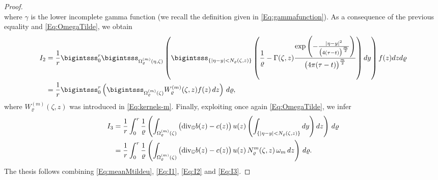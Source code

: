 \documentclass[11pt,a4paper]{article}
\numberwithin{equation}{section}
\def \r {\varrho}
\def \GG {{\mathbb{G}}}
\def \div {{\text{\rm div}}}
\def \t {{\tau}}
\def \y {{\eta}}
\def \z {{\zeta}}
\begin{document}
{{\begin{proof}
\begin{equation*}
	\end{equation*}
	where $\gamma$ is the lower incomplete gamma function (we recall the definition given in \eqref{Eq:gammafunction}). As a consequence of the previous equality and \eqref{Eq:OmegaTilde}, we obtain
	\begin{equation}\label{Eq:I2}
		\begin{aligned}
			I_2&=\frac{1}{r}  \bigintsss_0^{r} 
			\bigintsss_{{\Omega}^{(m)}_\r (\y,\z)}  \left(\bigintsss_{\lbrace |\y-y|< N_\r(\z,z) \rbrace}\left(\frac{1}{\r}-{\Gamma}(\z,z)\frac{\exp \left(-\frac{|\y-y|^2}{\big(4(\t-t)\big)^{\frac{m}{2}}} \right)}{\big(4\pi(\t-t)\big)^{\frac{m}{2}}} \right)dy  \right) f(z) dz  d \r \\
			&=\frac{1}{r} \bigintsss_0^{r} \left(\bigintsss_{{\Omega}^{(m)}_\r (\z)} W_\r^{(m)}(\z,z)f(z)\,dz\right)\, d\r,
		\end{aligned}
	\end{equation}
	where $W_\r^{(m)}(\z,z)$ was introduced in \eqref{Eq:kernels-m}. Finally, exploiting once again \eqref{Eq:OmegaTilde}, we infer
	\begin{equation}\label{Eq:I3}
		\begin{aligned}
			I_3&=\frac{1}{r} \int_0^{r}  \frac{1}{\r} \left(
			\int_{{\Omega}^{(m)}_\r (\z)}\big( \div_\GG b(z) - c(z) \big) \,u(z) \left(\int_{\lbrace |\y-y|< N_\r(\z,z) \rbrace}dy \right)  dz \right) \, d \r\\
			&=\frac{1}{r} \int_0^{r}  \frac{1}{\r} \left(
			\int_{{\Omega}^{(m)}_\r (\z)}\big( \div_\GG b(z) - c(z) \big) \,u(z) \, N_\r^m(\z,z)	\, \omega_m\,  dz \right) \, d \r.
		\end{aligned}
	\end{equation}
	The thesis follows combining \eqref{Eq:meanMtildeu}, \eqref{Eq:I1}, \eqref{Eq:I2} and \eqref{Eq:I3}.
\end{proof}
	
	












}}
\end{document}
